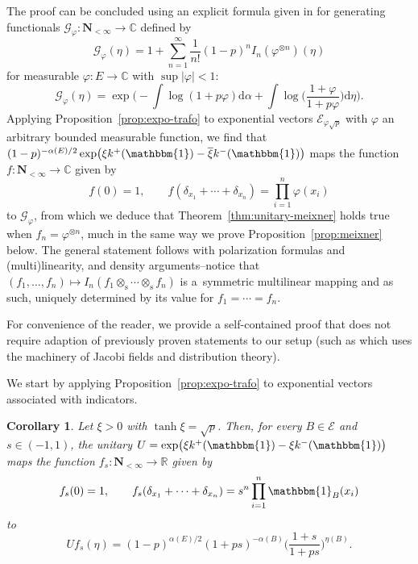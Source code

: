\documentclass[10pt,a4paper]{amsart}
\numberwithin{equation}{section}
\newtheorem{Corollary}[Theorem]{Corollary}
\newcommand{\R}{\mathbb{R}}
\newcommand{\C}{\mathbb{C}}
\newcommand{\dd}{\mathrm{d}} %
\newcommand{\1}{\mathbbm{1}}
\begin{document}
\begin{Remark}
 The proof can be concluded using an explicit formula given in \cite[Proposition~3.1]{lytvynov2003JFA} for generating functionals $\mathcal G_\varphi\colon \mathbf N_{<\infty}\to \C$ defined by
 \[
 	\mathcal G_\varphi(\eta)= 1+\sum_{n=1}^\infty \frac{1}{n!} (1-p)^n I_n(\varphi^{\otimes n})(\eta)
 \]
 for measurable $\varphi\colon E\to \C$ with $\sup |\varphi|<1$:
\[
	\mathcal G_\varphi(\eta) = \exp\biggl( - \int\log (1+ p \varphi) \dd \alpha + \int \log \biggl( \frac{1+ \varphi}{1+p\varphi}\biggr) \dd \eta\biggr).
\]
Applying Proposition~\ref{prop:expo-trafo} to exponential vectors $\mathcal E_{\varphi\sqrt p}$ with $\varphi$ an arbitrary bounded measurable function, we find that $(1-p)^{-\alpha(E)/2} \exp\bigl(\xi k^+(\1) - \overline{\xi} k^-(\1)\bigr)$ maps the function $f\colon\mathbf N_{<\infty}\to \C$ given by
\[
	f(0) =1,\qquad f(\delta_{x_1}+\cdots +\delta_{x_n}) = \prod_{i=1}^n \varphi(x_i)
\]
to $\mathcal G_\varphi$, from which we deduce that Theorem~\ref{thm:unitary-meixner} holds true when $f_n = \varphi^{\otimes n}$, much in the same way we prove Proposition~\ref{prop:meixner} below. The general statement follows with polarization formulas and (multi)linearity, and density arguments--notice that $(f_1,\ldots,f_n)\mapsto I_n(f_1\otimes_\mathrm s\cdots \otimes_\mathrm s f_n)$ is a~symmetric multilinear mapping and as such, uniquely determined by its value for $f_1=\cdots = f_n$.

For convenience of the reader, we provide a self-contained proof that does not require adaption of previously proven statements to our setup (such as \cite[Proposition~3.1]{lytvynov2003JFA} which uses the machinery of Jacobi fields and distribution theory).
\end{Remark}



We start by applying Proposition~\ref{prop:expo-trafo} to exponential vectors associated with indicators.

\begin{Corollary} \label{cor:u}
	Let $\xi>0$ with $\tanh \xi = \sqrt p$. Then, for every $B\in \mathcal E$ and $s\in (-1,1)$, the unitary $U = \exp\bigl(\xi k^+(\1)- \xi k^-(\1)\bigr)$ maps the function $f_s\colon \mathbf N_{<\infty}\to \R$ given by
	\[
		f_s(0) =1,\qquad f_s(\delta_{x_1}+\cdots + \delta_{x_n}) = s^n \prod_{i=1}^n \1_B(x_i)
	\]
	to
	\[
		Uf_s(\eta) = (1-p)^{\alpha(E)/2} ( 1 + p s )^{-\alpha (B)} \biggl( \frac{1+s}{1+ps}\biggr)^{\eta(B)}.
	\]
\end{Corollary}
\end{document}
